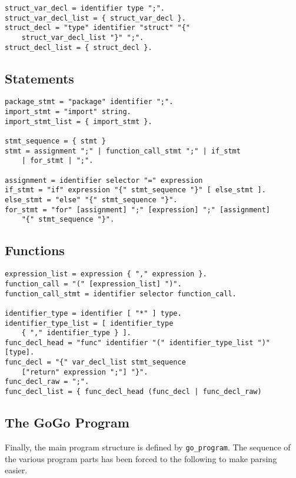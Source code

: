 \documentclass[a4paper]{scrreprt}
\begin{document}
        \begin{lstlisting}[caption=Structs]
struct_var_decl = identifier type ";".
struct_var_decl_list = { struct_var_decl }.
struct_decl = "type" identifier "struct" "{" 
    struct_var_decl_list "}" ";".
struct_decl_list = { struct_decl }. 
        \end{lstlisting}

      \subsection*{Statements}

        \begin{lstlisting}[caption=Statements]
package_stmt = "package" identifier ";".
import_stmt = "import" string.
import_stmt_list = { import_stmt }.

stmt_sequence = { stmt }
stmt = assignment ";" | function_call_stmt ";" | if_stmt 
    | for_stmt | ";".

assignment = identifier selector "=" expression
if_stmt = "if" expression "{" stmt_sequence "}" [ else_stmt ].
else_stmt = "else" "{" stmt_sequence "}".
for_stmt = "for" [assignment] ";" [expression] ";" [assignment] 
    "{" stmt_sequence "}".
        \end{lstlisting}

      \subsection*{Functions}

        \begin{lstlisting}[caption=Functions]
expression_list = expression { "," expression }.
function_call = "(" [expression_list] ")".
function_call_stmt = identifier selector function_call.

identifier_type = identifier [ "*" ] type.
identifier_type_list = [ identifier_type 
    { "," identifier_type } ].
func_decl_head = "func" identifier "(" identifier_type_list ")"  [type].
func_decl = "{" var_decl_list stmt_sequence 
    ["return" expression ";"] "}".
func_decl_raw = ";".
func_decl_list = { func_decl_head (func_decl | func_decl_raw) 
        \end{lstlisting}

      \subsection*{The GoGo Program}
        Finally, the main program structure is defined by \texttt{go\_program}. The sequence of the various program parts has been forced to the following to make parsing easier.
\end{document}
